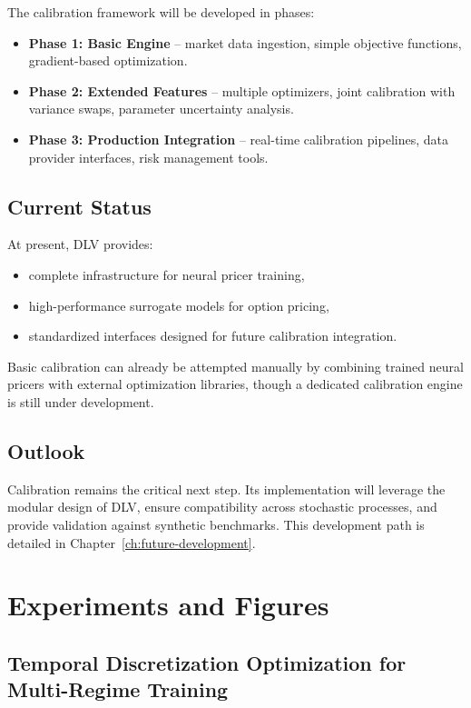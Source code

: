 	The calibration framework will be developed in phases:
	
	\begin{itemize}[nosep]
		\item \textbf{Phase 1: Basic Engine} – market data ingestion, simple objective functions, gradient-based optimization.
		\item \textbf{Phase 2: Extended Features} – multiple optimizers, joint calibration with variance swaps, parameter uncertainty analysis.
		\item \textbf{Phase 3: Production Integration} – real-time calibration pipelines, data provider interfaces, risk management tools.
	\end{itemize}
	
	\section{Current Status}
	
	At present, DLV provides:
	
	\begin{itemize}[nosep]
		\item complete infrastructure for neural pricer training,
		\item high-performance surrogate models for option pricing,
		\item standardized interfaces designed for future calibration integration.
	\end{itemize}
	
	Basic calibration can already be attempted manually by combining trained neural pricers
	with external optimization libraries, though a dedicated calibration engine is still under development.
	
	\section{Outlook}
	
	Calibration remains the critical next step. Its implementation will leverage the modular
	design of DLV, ensure compatibility across stochastic processes, and provide validation
	against synthetic benchmarks. This development path is detailed in 
	Chapter~\ref{ch:future-development}.
	
	
	\chapter{Experiments and Figures}
	\section{Temporal Discretization Optimization for Multi-Regime Training}
	\label{sec:discretization-optimization}
	

